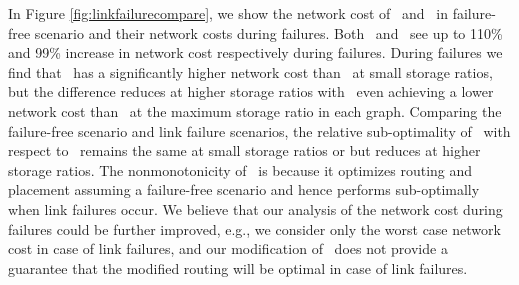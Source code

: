 In Figure  \ref{fig:linkfailurecompare}, we show the network cost of \invlru\ and \optrpfuture\ in failure-free scenario and their network costs during failures. Both \invlru\ and \optrpfuture\ see up to 110\% and 99\% increase in network cost  respectively during failures.  During failures we find that \invlru\  has a significantly higher network cost than \optrpfuture\  at small storage ratios, but the difference reduces at higher storage ratios with \invlru\ even achieving a lower network cost than \optrpfuture\ at the maximum storage ratio in each graph.  Comparing the failure-free scenario and link failure scenarios, the relative sub-optimality of \invlru\ with respect to \optrpfuture\ remains the same at small storage ratios or but reduces at higher storage ratios. The nonmonotonicity of \optrpfuture\ is because it optimizes routing and placement assuming a failure-free scenario and hence performs sub-optimally when link failures occur. We believe that our analysis of the network cost during failures could be further improved, e.g., we  consider only the worst case network cost in case of link failures, and our modification of \optrpfuture\ does not provide a  guarantee that the modified routing will be optimal in case of link failures.
















